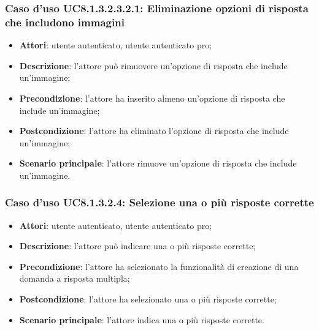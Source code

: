\subsubsection{Caso d'uso UC8.1.3.2.3.2.1: Eliminazione opzioni di risposta che includono immagini}
		\begin{itemize}
		\item
			\textbf{Attori}: utente autenticato, utente autenticato pro;
		\item		
			\textbf{Descrizione}: l'attore può rimuovere un'opzione di risposta che include un'immagine;
		\item
			\textbf{Precondizione}: l'attore ha inserito almeno un'opzione di risposta che include un'immagine;
		\item
			\textbf{Postcondizione}: l'attore ha eliminato l'opzione di risposta che include un'immagine;
		\item
			\textbf{Scenario principale}: l'attore rimuove un'opzione di risposta che include un'immagine.				
		\end{itemize}
		
\subsubsection{Caso d'uso UC8.1.3.2.4: Selezione una o più risposte corrette}
	\begin{itemize}
		\item
			\textbf{Attori}: utente autenticato, utente autenticato pro;
		\item		
			\textbf{Descrizione}: l'attore può indicare una o più risposte corrette;
		\item
			\textbf{Precondizione}: l'attore ha selezionato la funzionalità di creazione di una domanda a risposta multipla;
		\item
			\textbf{Postcondizione}: l'attore ha selezionato una o più risposte corrette;
		\item
			\textbf{Scenario principale}: l'attore indica una o più risposte corrette. 			
	\end{itemize}
